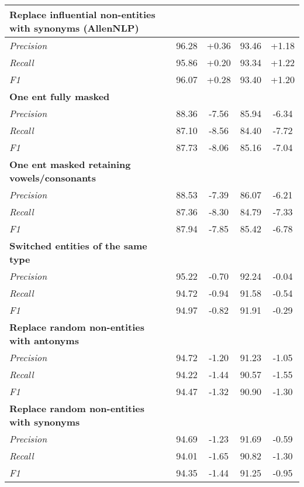 \begin{table}[t]
\begin{singlespace}
\begin{tabular}{@{} R{0.17\textwidth} c c c c @{}}
        \textbf{Replace influential non-entities with synonyms (AllenNLP)} &&&&     \\\midrule
            \textit{Precision}  & 96.28 & +0.36 & 93.46 & +1.18   \\ 
            \textit{Recall}     & 95.86 & +0.20 & 93.34 & +1.22   \\ 
            \textit{F1}         & 96.07 & +0.28 & 93.40 & +1.20   \\\bottomrule
            
        \textbf{One ent fully masked} &&&&                        \\\midrule
            \textit{Precision}  & 88.36 & -7.56 & 85.94 & -6.34   \\ 
            \textit{Recall}     & 87.10 & -8.56 & 84.40 & -7.72   \\ 
            \textit{F1}         & 87.73 & -8.06 & 85.16 & -7.04   \\\bottomrule
            
        \textbf{One ent masked retaining vowels/consonants} &&&&    \\\midrule
            \textit{Precision}  & 88.53 & -7.39 & 86.07 & -6.21   \\ 
            \textit{Recall}     & 87.36 & -8.30 & 84.79 & -7.33   \\ 
            \textit{F1}         & 87.94 & -7.85 & 85.42 & -6.78   \\\bottomrule
            
        \textbf{Switched entities of the same type} &&&&    \\\midrule
            \textit{Precision}  & 95.22 & -0.70 & 92.24 & -0.04   \\ 
            \textit{Recall}     & 94.72 & -0.94 & 91.58 & -0.54   \\ 
            \textit{F1}         & 94.97 & -0.82 & 91.91 & -0.29   \\\bottomrule

        \textbf{Replace random non-entities with antonyms} &&&&   \\\midrule
            \textit{Precision}  & 94.72 & -1.20 & 91.23 & -1.05   \\ 
            \textit{Recall}     & 94.22 & -1.44 & 90.57 & -1.55   \\ 
            \textit{F1}         & 94.47 & -1.32 & 90.90 & -1.30   \\\bottomrule
            
        \textbf{Replace random non-entities with synonyms} &&&&     \\\midrule
            \textit{Precision}  & 94.69 & -1.23 & 91.69 & -0.59   \\ 
            \textit{Recall}     & 94.01 & -1.65 & 90.82 & -1.30   \\ 
            \textit{F1}         & 94.35 & -1.44 & 91.25 & -0.95   \\\bottomrule


\end{tabular}
\end{singlespace}
\end{table}
